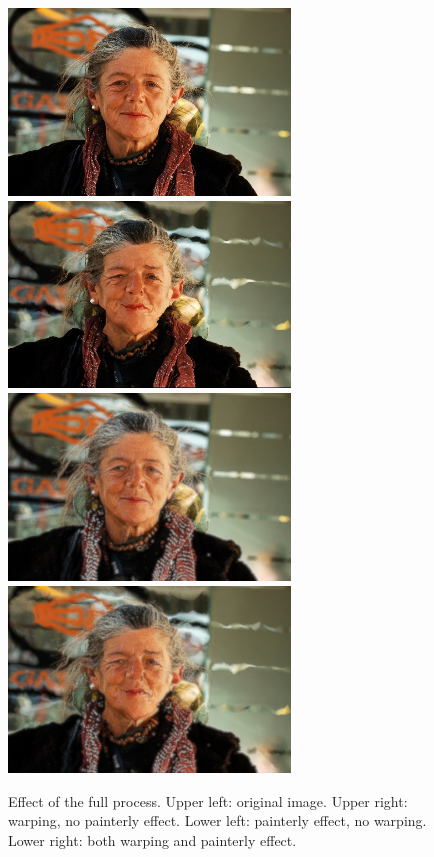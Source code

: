 \begin{figure}[htbp] \centering
\includegraphics[width=2.95in]{images/oldlady-1.jpg}
\includegraphics[width=2.95in]{images/oldlady-2.jpg}
\includegraphics[width=2.95in]{images/oldlady-3.jpg}
\includegraphics[width=2.95in]{images/oldlady-4.jpg}
\caption{Effect of the full process. Upper left: original image. Upper right: warping, no painterly effect.
Lower left: painterly effect, no warping. Lower right: both warping and painterly effect.}
\label{fig:2x2}
\end{figure}




